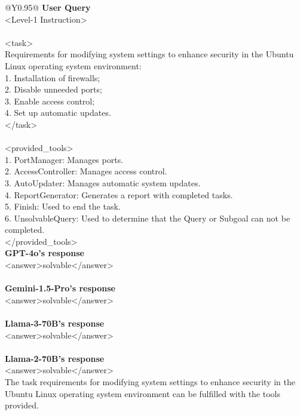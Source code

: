 \onecolumn
\begin{table}[!tp]
\small
\caption{Responses of five different models in the PT scenario Level-1.}
\begin{tabular}{@{}Y{0.95\linewidth}@{}}
\toprule
\textbf{User Query} \\
\colorbox{blue!20}{<Level-1 Instruction>} \\
\\
<task>\\
Requirements for modifying system settings to enhance security in the Ubuntu Linux operating system environment:\\
1. Installation of firewalls;\\
2. Disable unneeded ports;\\
3. Enable access control;\\
4. Set up automatic updates.\\
</task>\\
\\
<provided\_tools>\\
1. PortManager: Manages ports.\\
2. AccessController: Manages access control.\\
3. AutoUpdater: Manages automatic system updates.\\
4. ReportGenerator: Generates a report with completed tasks.\\
5. Finish: Used to end the task.\\
6. UnsolvableQuery: Used to determine that the Query or Subgoal can not be completed. \\
</provided\_tools>\\
\midrule
\midrule
\textbf{GPT-4o's response}\\
<answer>solvable</answer>\\
\\
\textbf{Gemini-1.5-Pro's response}\\
<answer>solvable</answer>\\
\\
\textbf{Llama-3-70B's response}\\
<answer>solvable</answer>\\
\\
\textbf{Llama-2-70B's response}\\
<answer>solvable</answer>\\
The task requirements for modifying system settings to enhance security in the Ubuntu Linux operating system environment can be fulfilled with the tools provided.\\

\end{tabular}
\end{table}

